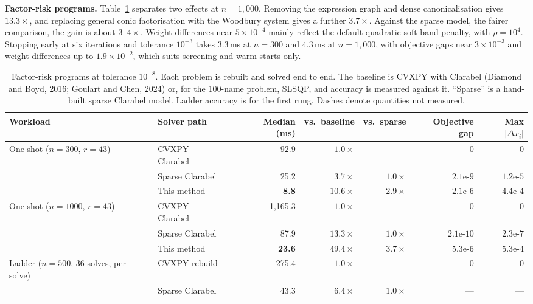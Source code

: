 \documentclass[10pt,twocolumn,letterpaper]{article}
\begin{document}
\textbf{Factor-risk programs.} Table~\ref{tab:benchmarks} separates two effects at $n = 1{,}000$. Removing the expression graph and dense canonicalisation gives $13.3\times$, and replacing general conic factorisation with the Woodbury system gives a further $3.7\times$. Against the sparse model, the fairer comparison, the gain is about $3$--$4\times$. Weight differences near $5 \times 10^{-4}$ mainly reflect the default quadratic soft-band penalty, with $\rho = 10^4$. Stopping early at six iterations and tolerance $10^{-3}$ takes 3.3\,ms at $n = 300$ and 4.3\,ms at $n = 1{,}000$, with objective gaps near $3 \times 10^{-3}$ and weight differences up to $1.9 \times 10^{-2}$, which suits screening and warm starts only.

\begin{table}[t]
\centering
\caption{Factor-risk programs at tolerance $10^{-8}$. Each problem is rebuilt and solved end to end. The baseline is CVXPY with Clarabel (Diamond and Boyd, 2016; Goulart and Chen, 2024) or, for the 100-name problem, SLSQP, and accuracy is measured against it. ``Sparse'' is a hand-built sparse Clarabel model. Ladder accuracy is for the first rung. Dashes denote quantities not measured.}
\label{tab:benchmarks}
\footnotesize
\setlength{\tabcolsep}{5pt}
\begin{tabular}{llrrrrr}
\toprule
Workload & Solver path & Median (ms) & vs.\ baseline & vs.\ sparse & Objective gap & Max $|\Delta x_i|$ \\
\midrule
One-shot ($n=300$, $r=43$) & CVXPY + Clarabel & 92.9 & $1.0\times$ & --- & $0$ & $0$ \\
& Sparse Clarabel & 25.2 & $3.7\times$ & $1.0\times$ & $2.1\text{e-}9$ & $1.2\text{e-}5$ \\
& This method & \textbf{8.8} & $\mathbf{10.6\times}$ & $\mathbf{2.9\times}$ & $2.1\text{e-}6$ & $4.4\text{e-}4$ \\
\addlinespace[2pt]
One-shot ($n=1000$, $r=43$) & CVXPY + Clarabel & 1,165.3 & $1.0\times$ & --- & $0$ & $0$ \\
& Sparse Clarabel & 87.9 & $13.3\times$ & $1.0\times$ & $2.1\text{e-}10$ & $2.3\text{e-}7$ \\
& This method & \textbf{23.6} & $\mathbf{49.4\times}$ & $\mathbf{3.7\times}$ & $5.3\text{e-}6$ & $5.3\text{e-}4$ \\
\addlinespace[2pt]
Ladder ($n=500$, 36 solves, per solve) & CVXPY rebuild & 275.4 & $1.0\times$ & --- & $0$ & $0$ \\
& Sparse Clarabel & 43.3 & $6.4\times$ & $1.0\times$ & --- & --- \\

\end{tabular}
\end{table}
\end{document}
